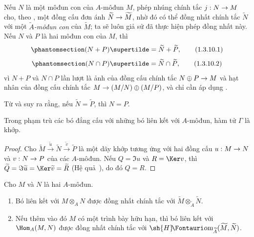 \documentclass[oneside]{amsart}
\makeatletter
\newcommand{\ega@arrow}[2]{\mathchoice{#1}{#2}{#2}{#2}}
\renewcommand{\to}{\ega@arrow{\longrightarrow}{\rightarrow}}
\newcommand*{\ega@sheafop}[3]{\sh{#1}#2\textup{\kern-2.2pt{\Fontauri\slshape #3}}}
\newcommand*{\shHom}{\ega@sheafop{H}{}{om}}
\let\EGAOriginalLabel\label
\renewcommand{\label}[1]{\phantomsection\EGAOriginalLabel{#1}}
\makeatother
\begin{document}
\begin{env}[1.3.10]
\label{I.1.3.10}
Nếu $N$ là một môđun con của $A$-môđun $M$, phép nhúng chính tắc $j:N\to M$ cho, theo , một đồng cấu đơn ánh $\widetilde{N}\to\widetilde{M}$, nhờ đó có thể đồng nhất chính tắc $\widetilde{N}$ với một \emph{$\widetilde{A}$-môđun con} của $\widetilde{M}$;
ta sẽ luôn giả sử đã thực hiện phép đồng nhất này.
Nếu $N$ và $P$ là hai môđun con của $M$, thì
\[
\label{I.1.3.10.1}
  (N+P)\supertilde=\widetilde{N}+\widetilde{P},
  \tag{1.3.10.1}
\]
\[
\label{I.1.3.10.2}
  (N\cap P)\supertilde=\widetilde{N}\cap\widetilde{P},
  \tag{1.3.10.2}
\]
vì $N+P$ và $N\cap P$ lần lượt là ảnh của đồng cấu chính tắc
$N\oplus P\to M$ và hạt nhân của đồng cấu chính tắc $M\to(M/N)\oplus(M/P)$, và chỉ cần áp dụng .

Từ  và  suy ra rằng, nếu $\widetilde{N}=\widetilde{P}$, thì $N=P$.
\end{env}

\begin{corollary}[1.3.11]
\label{I.1.3.11}
Trong phạm trù các bó đẳng cấu với những bó liên kết với $A$-môđun, hàm tử $\Gamma$ là khớp.
\end{corollary}

\begin{proof}
Cho $\widetilde{M}\xrightarrow{\widetilde{u}}\widetilde{N}\xrightarrow{\widetilde{v}}\widetilde{P}$ là một dãy khớp tương ứng với hai đồng cấu $u:M\to N$ và $v:N\to P$ của các $A$-môđun.
Nếu $Q=\Im u$ và $R=\Ker v$, thì $\widetilde{Q}=\Im\widetilde{u}=\Ker\widetilde{v}=\widetilde{R}$ (Hệ quả~), do đó $Q=R$.
\end{proof}

\begin{corollary}[1.3.12]
\label{I.1.3.12}
Cho $M$ và $N$ là hai $A$-môđun.
\begin{enumerate}
  \item[{\rm(i)}] Bó liên kết với $M\otimes_A N$ được đồng nhất chính tắc với $\widetilde{M}\otimes_{\widetilde{A}}\widetilde{N}$.
  \item[{\rm(ii)}] Nếu thêm vào đó $M$ có một trình bày hữu hạn, thì bó liên kết với $\Hom_A(M,N)$ được đồng nhất chính tắc với $\shHom_{\widetilde{A}}(\widetilde{M},\widetilde{N})$.
\end{enumerate}
\end{corollary}
\end{document}
